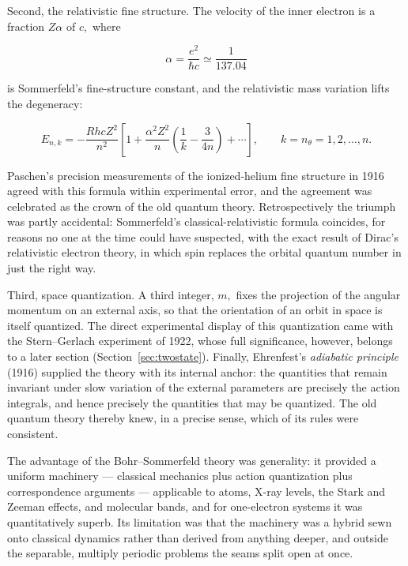 Second, the relativistic fine structure. The velocity of the inner electron is a fraction $Z\alpha$ of $c,$ where
\begin{linenomath}
    \begin{equation}
        \alpha=\frac{e^2}{\hbar c}\simeq\frac{1}{137.04}
    \end{equation}
\end{linenomath}
is Sommerfeld's fine-structure constant, and the relativistic mass variation lifts the degeneracy:
\begin{linenomath}
    \begin{equation}
        E_{n,k}=-\frac{RhcZ^2}{n^2}\left[1+\frac{\alpha^2Z^2}{n}\left(\frac1k-\frac{3}{4n}\right)+\cdots\right],
        \qquad k=n_\theta=1,2,\dots,n.
    \end{equation}
\end{linenomath}
Paschen's precision measurements of the ionized-helium fine structure in 1916 agreed with this formula within experimental error, and the agreement was celebrated as the crown of the old quantum theory. Retrospectively the triumph was partly accidental: Sommerfeld's classical-relativistic formula coincides, for reasons no one at the time could have suspected, with the exact result of Dirac's relativistic electron theory, in which spin replaces the orbital quantum number in just the right way.

Third, space quantization. A third integer, $m,$ fixes the projection of the angular momentum on an external axis, so that the orientation of an orbit in space is itself quantized. The direct experimental display of this quantization came with the Stern--Gerlach experiment of 1922, whose full significance, however, belongs to a later section (Section~\ref{sec:twostate}). Finally, Ehrenfest's \emph{adiabatic principle} (1916) supplied the theory with its internal anchor: the quantities that remain invariant under slow variation of the external parameters are precisely the action integrals, and hence precisely the quantities that may be quantized. The old quantum theory thereby knew, in a precise sense, which of its rules were consistent.

The advantage of the Bohr--Sommerfeld theory was generality: it provided a uniform machinery --- classical mechanics plus action quantization plus correspondence arguments --- applicable to atoms, X-ray levels, the Stark and Zeeman effects, and molecular bands, and for one-electron systems it was quantitatively superb. Its limitation was that the machinery was a hybrid sewn onto classical dynamics rather than derived from anything deeper, and outside the separable, multiply periodic problems the seams split open at once.

